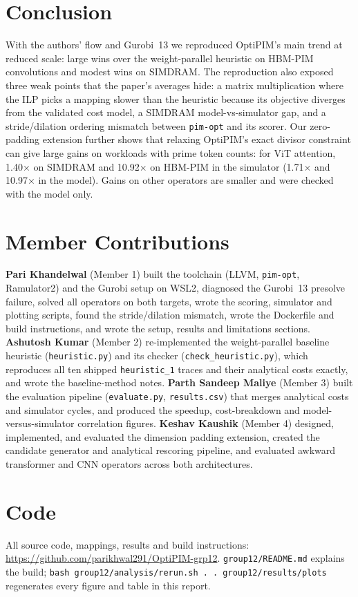 \documentclass[conference]{IEEEtran}
\begin{document}
\section{Conclusion}
With the authors' flow and Gurobi~13 we reproduced OptiPIM's main trend at
reduced scale: large wins over the weight-parallel heuristic on HBM-PIM
convolutions and modest wins on SIMDRAM. The reproduction also exposed three
weak points that the paper's averages hide: a matrix multiplication where the
ILP picks a mapping slower than the heuristic because its objective diverges
from the validated cost model, a SIMDRAM model-vs-simulator gap, and a
stride/dilation ordering mismatch between \texttt{pim-opt} and its scorer.
Our zero-padding extension further shows that relaxing OptiPIM's exact divisor constraint can give large gains on workloads with prime token counts: for ViT attention, 1.40$\times$ on SIMDRAM and 10.92$\times$ on HBM-PIM in the simulator (1.71$\times$ and 10.97$\times$ in the model). Gains on other operators are smaller and were checked with the model only.

\section*{Member Contributions}
\textbf{Pari Khandelwal} (Member 1) built the toolchain (LLVM, \texttt{pim-opt},
Ramulator2) and the Gurobi setup on WSL2, diagnosed the Gurobi~13 presolve
failure, solved all operators on both targets, wrote the scoring, simulator and
plotting scripts, found the stride/dilation mismatch, wrote the Dockerfile and
build instructions, and wrote the setup, results and limitations sections.
\textbf{Ashutosh Kumar} (Member 2) re-implemented the weight-parallel baseline heuristic (\texttt{heuristic.py}) and its checker (\texttt{check\_heuristic.py}), which reproduces all ten shipped \texttt{heuristic\_1} traces and their analytical costs exactly, and wrote the baseline-method notes.
\textbf{Parth Sandeep Maliye} (Member 3) built the evaluation pipeline (\texttt{evaluate.py}, \texttt{results.csv}) that merges analytical costs and simulator cycles, and produced the speedup, cost-breakdown and model-versus-simulator correlation figures.
\textbf{Keshav Kaushik} (Member 4) designed, implemented, and evaluated the dimension padding extension, created the candidate generator and analytical rescoring pipeline, and evaluated awkward transformer and CNN operators across both architectures.

\section*{Code}
All source code, mappings, results and build instructions:
\url{https://github.com/parikhwal291/OptiPIM-grp12}. \texttt{group12/README.md}
explains the build; \texttt{bash group12/analysis/rerun.sh . . group12/results/plots}
regenerates every figure and table in this report.
\end{document}
